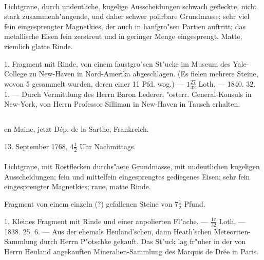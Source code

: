 \documentclass[a4paper, 11pt, oneside, polutonikogreek, german]{article}
\begin{document}
\paragraph{}
Lichtgrane, durch undeutliche, kugelige Ausscheidungen schwach gefleckte, nicht stark zusammenh"angende, und daher schwer polirbare Grundmasse; sehr viel fein eingesprengter Magnetkies, der auch in hanfgro"sen Partien auftritt; das metallische Eisen fein zerstreut und in geringer Menge eingesprengt. Matte, ziemlich glatte Rinde.

1. Fragment mit Rinde, von einem faustgro"sen St"ucke im Museum des Yale-College zu New-Haven in Nord-Amerika abgeschlagen. (Es fielen mehrere Steine, wovon 5 gesammelt wurden, deren einer 11 Pfd. wog.) --- $\mathfrak{1\frac{27}{32}}$ Loth. --- 1840. 32. 1. --- Durch Vermittlung des Herrn Baron Lederer, "osterr. General-Konsuls in New-York, von Herrn Professor Silliman in New-Haven in Tausch erhalten.
\subsection[\swabfamily {Lucé.}]{}
\begin{center}

en Maine, jetzt Dép. de la Sarthe, Frankreich.

13. September 1768, $\mathfrak{4\frac{1}{2}}$ Uhr Nachmittags.
\end{center}
\paragraph{}
Lichtgraue, mit Rostflecken durchs"aete Grundmasse, mit undeutlichen kugeligen Ausscheidungen; fein und mittelfein eingesprengtes gediegenes Eisen; sehr fein eingesprengter Magnetkies; raue, matte Rinde.

Fragment von einem einzeln (?) gefallenen Steine von $\mathfrak{7\frac{1}{2}}$ Pfund.

1. Kleines Fragment mit Rinde und einer anpolierten Fl"ache. --- $\mathfrak{\frac{17}{32}}$ Loth. --- 1838. 25. 6. --- Aus der ehemals Heuland'schen, dann Heath'schen Meteoriten-Sammlung durch Herrn P"otschke gekauft. Das St"uck lag fr"uher in der von Herrn Heuland angekauften Mineralien-Sammlung des Marquis de Drée in Paris.

\setlength{\leftskip}{10mm}
\setlength{\parindent}{0pt}
\end{document}
